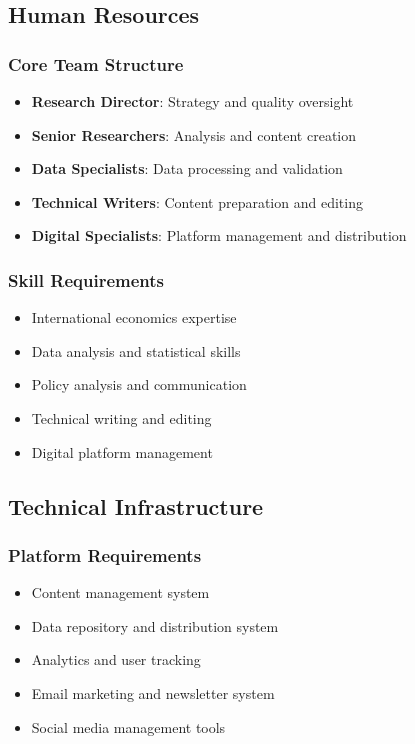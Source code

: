 \documentclass[11pt,a4paper]{article}
\begin{document}
\subsection{Human Resources}

\subsubsection{Core Team Structure}
\begin{itemize}
    \item \textbf{Research Director}: Strategy and quality oversight
    \item \textbf{Senior Researchers}: Analysis and content creation
    \item \textbf{Data Specialists}: Data processing and validation
    \item \textbf{Technical Writers}: Content preparation and editing
    \item \textbf{Digital Specialists}: Platform management and distribution
\end{itemize}

\subsubsection{Skill Requirements}
\begin{itemize}
    \item International economics expertise
    \item Data analysis and statistical skills
    \item Policy analysis and communication
    \item Technical writing and editing
    \item Digital platform management
\end{itemize}

\subsection{Technical Infrastructure}

\subsubsection{Platform Requirements}
\begin{itemize}
    \item Content management system
    \item Data repository and distribution system
    \item Analytics and user tracking
    \item Email marketing and newsletter system
    \item Social media management tools
\end{itemize}
\end{document}
